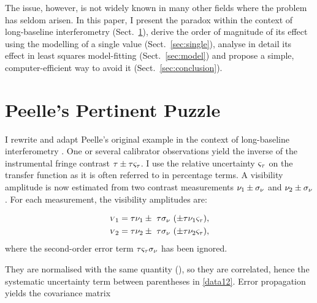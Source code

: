 \documentclass{pasa}
\begin{document}
The issue, however, is not widely known in many other fields where the problem has seldom arisen.  In this paper, I present the paradox within the context of long-baseline interferometry (Sect.~\ref{sec:ppp}), derive the order of magnitude of its effect using the modelling of a single value (Sect.~\ref{sec:single}), analyse in detail its effect in least squares model-fitting (Sect.~\ref{sec:model}) and propose a simple, computer-efficient way to avoid it (Sect.~\ref{sec:conclusion}).  

\section{Peelle's Pertinent Puzzle}
\label{sec:ppp}
I rewrite and adapt Peelle's original example in the context of long-baseline interferometry \citep[see][Sect.~1 \& 2.1]{NEU12}. One or several calibrator observations yield the inverse of the instrumental fringe contrast $\tau \pm \tau\varsigma_\tau$.  I use the relative uncertainty $\varsigma_\tau$ on the transfer function as it is often referred to in percentage terms. A visibility amplitude is now estimated from two contrast measurements $\nu_1 \pm \sigma_\nu$ and $\nu_2 \pm \sigma_\nu$.  For each measurement, the visibility amplitudes are:

\begin{subequations}
\begin{align}
    {\scriptstyle V}_1 &= \tau\nu_1 \pm\ \tau\sigma_\nu\ (\pm \tau\nu_1\varsigma_\tau),\\
    {\scriptstyle V}_2 &= \tau\nu_2 \pm\ \tau\sigma_\nu\ (\pm \tau\nu_2\varsigma_\tau),
\end{align}
\label{eq:data12}
\end{subequations}
where the second-order error term $\tau\varsigma_\tau\sigma_\nu$ has been ignored.

They are normalised with the same quantity (\cot), so they are correlated, hence the systematic uncertainty term between parentheses in \eqref{data12}. Error propagation yields the covariance matrix
\end{document}

